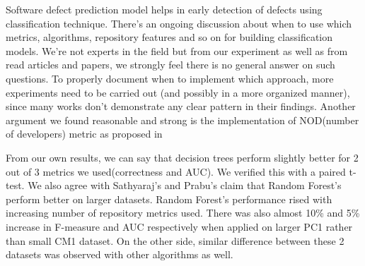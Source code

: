 Software defect prediction model helps in early detection of defects using classification technique. There's an ongoing discussion about when to use which metrics, algorithms, repository features and so on for building classification models. We're not experts in the field but from our experiment as well as from read articles and papers, we strongly feel there is no general answer on such questions. To properly document when to implement which approach, more experiments need to be carried out (and possibly in a more organized manner), since many works don't demonstrate any clear pattern in their findings. Another argument we found reasonable and strong is the implementation of NOD(number of developers) metric as proposed in 

From our own results, we can say that decision trees perform slightly better for 2 out of 3 metrics we used(correctness and AUC).  We verified this with a paired t-test. We also agree with Sathyaraj's and Prabu's claim\cite{sathyaraj2015approach} that Random Forest's perform better on larger datasets. Random Forest's performance rised with increasing number of repository metrics used. There was also almost 10\% and 5\% increase in F-measure and AUC respectively when applied on larger PC1 rather than small CM1 dataset. On the other side, similar difference between these 2 datasets was observed with other algorithms as well.
